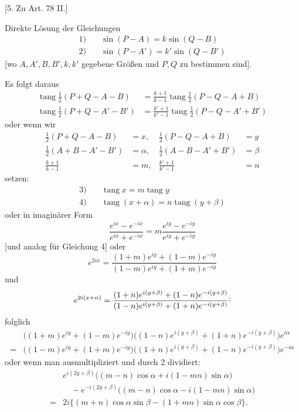 \begin{center}
[5. Zu Art. 78 II.]
\end{center}
Direkte Lösung der Gleichungen
\[
\begin{aligned}
1)\quad&\sin(P-A)=k\sin(Q-B)\\
2)\quad&\sin(P-A')=k'\sin(Q-B')
\end{aligned}
\]
[wo \(A,A',B,B',k,k'\) gegebene Größen und \(P,Q\) zu bestimmen sind].

Es folgt daraus
\[
\begin{aligned}
\operatorname{tang}\tfrac12(P+Q-A-B)&=\frac{k+1}{k-1}\operatorname{tang}\tfrac12(P-Q-A+B)\\
\operatorname{tang}\tfrac12(P+Q-A'-B')&=\frac{k'+1}{k'-1}\operatorname{tang}\tfrac12(P-Q-A'+B')
\end{aligned}
\]
oder wenn wir
\[
\begin{aligned}
\tfrac12(P+Q-A-B)&=x, &\tfrac12(P-Q-A+B)&=y\\
\tfrac12(A+B-A'-B')&=\alpha, &\tfrac12(A-B-A'+B')&=\beta\\
\frac{k+1}{k-1}&=m, &\frac{k'+1}{k'-1}&=n
\end{aligned}
\]
setzen:
\[
\begin{aligned}
3)\quad&\operatorname{tang}x=m\operatorname{tang}y\\
4)\quad&\operatorname{tang}(x+\alpha)=n\operatorname{tang}(y+\beta)
\end{aligned}
\]
oder in imaginärer Form
\[
\frac{e^{ix}-e^{-ix}}{e^{ix}+e^{-ix}}=m\frac{e^{iy}-e^{-iy}}{e^{iy}+e^{-iy}}
\]
[und analog für Gleichung 4] oder
\[
e^{2ix}=\frac{(1+m)e^{iy}+(1-m)e^{-iy}}{(1-m)e^{iy}+(1+m)e^{-iy}}
\]
und
\[
e^{2i(x+\alpha)}=\frac{(1+n)e^{i(y+\beta)}+(1-n)e^{-i(y+\beta)}}{(1-n)e^{i(y+\beta)}+(1+n)e^{-i(y+\beta)}}\mathpunct{\raisebox{.45ex}{;}}
\]
folglich
\[
\begin{aligned}
&\bigl((1+m)e^{iy}+(1-m)e^{-iy}\bigr)\bigl((1-n)e^{i(y+\beta)}+(1+n)e^{-i(y+\beta)}\bigr)e^{i\alpha}\\
={}&\bigl((1-m)e^{iy}+(1+m)e^{-iy}\bigr)\bigl((1+n)e^{i(y+\beta)}+(1-n)e^{-i(y+\beta)}\bigr)e^{-i\alpha}
\end{aligned}
\]
oder wenn man ausmultipliziert und durch 2 dividiert:
\[
\begin{aligned}
&e^{i(2y+\beta)}\bigl((m-n)\cos\alpha+i(1-mn)\sin\alpha\bigr)\\
&\quad-e^{-i(2y+\beta)}\bigl((m-n)\cos\alpha-i(1-mn)\sin\alpha\bigr)\\
={}&2i\bigl\{(m+n)\cos\alpha\sin\beta-(1+mn)\sin\alpha\cos\beta\bigr\}.
\end{aligned}
\]

